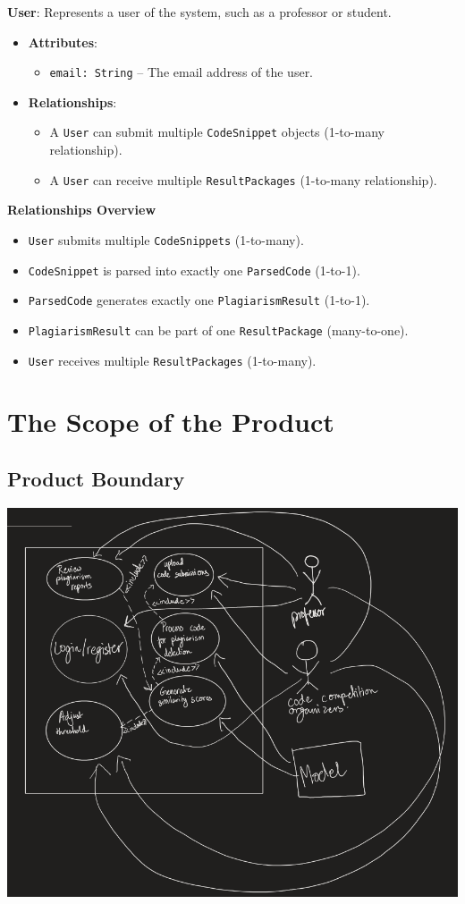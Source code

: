 \documentclass[12pt]{article}
\begin{document}
\textbf{User}: Represents a user of the system, such as a professor or student.
\begin{itemize}
    \item \textbf{Attributes}:
    \begin{itemize}
        \item \texttt{email: String} -- The email address of the user.
    \end{itemize}
    \item \textbf{Relationships}:
    \begin{itemize}
        \item A \texttt{User} can submit multiple \texttt{CodeSnippet} objects (1-to-many relationship).
        \item A \texttt{User} can receive multiple \texttt{ResultPackages} (1-to-many relationship).
    \end{itemize}
\end{itemize}

\textbf{Relationships Overview}
\begin{itemize}
    \item \texttt{User} submits multiple \texttt{CodeSnippets} (1-to-many).
    \item \texttt{CodeSnippet} is parsed into exactly one \texttt{ParsedCode} (1-to-1).
    \item \texttt{ParsedCode} generates exactly one \texttt{PlagiarismResult} (1-to-1).
    \item \texttt{PlagiarismResult} can be part of one \texttt{ResultPackage} (many-to-one).
    \item \texttt{User} receives multiple \texttt{ResultPackages} (1-to-many).
\end{itemize}



\section{The Scope of the Product}
\subsection{Product Boundary}
\includegraphics[height=.78\textheight]{assets/UseCase.png}
\end{document}
